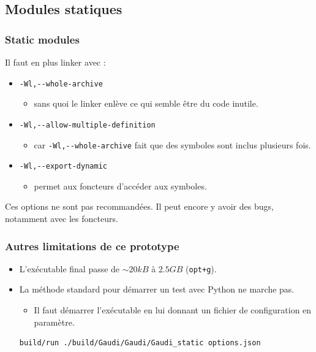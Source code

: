 \documentclass{beamer}
\begin{document}
\subsection{Modules statiques}

\begin{frame}[fragile]
    \frametitle{Static modules}

    Il faut en plus linker avec :
    \begin{itemize}
        \item \verb'-Wl,--whole-archive'
              \begin{itemize}
                  \item sans quoi le linker enlève ce qui semble être du code inutile.
              \end{itemize}
        \item \verb'-Wl,--allow-multiple-definition'
              \begin{itemize}
                  \item car \verb'-Wl,--whole-archive' fait que des symboles sont inclus plusieurs fois.
              \end{itemize}
        \item \verb'-Wl,--export-dynamic'
              \begin{itemize}
                  \item permet aux foncteurs d'accéder aux symboles.
              \end{itemize}
    \end{itemize}

    Ces options ne sont pas recommandées.
    Il peut encore y avoir des bugs, notamment avec les foncteurs.
\end{frame}

\begin{frame}[fragile]
    \frametitle{Autres limitations de ce prototype}

    \begin{itemize}
        \item L'exécutable final passe de $ \sim 20 kB $ à $ 2.5 GB $ (\verb'opt+g').
        \item La méthode standard pour démarrer un test avec Python ne marche pas.
              \begin{itemize}
                  \item Il faut démarrer l'exécutable en lui donnant un fichier de configuration en paramètre.
              \end{itemize}
              \begin{lstlisting}[language=bash,basicstyle=\scriptsize,breaklines]
build/run ./build/Gaudi/Gaudi/Gaudi_static options.json
            \end{lstlisting}
    \end{itemize}
\end{frame}
\end{document}
